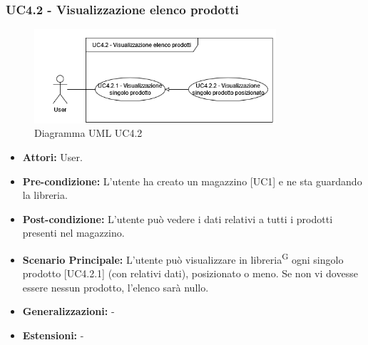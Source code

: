 \subsubsection{UC4.2 - Visualizzazione elenco prodotti}
\begin{figure}[H]
  \centering
  \includegraphics[width=0.8\textwidth]{UC_diagrams_1-10/UC4.2.drawio.png}
   \caption{Diagramma UML UC4.2}
\end{figure}
\begin{itemize}
    \item \textbf{Attori:} User.
    \item \textbf{Pre-condizione:}  L'utente ha creato un magazzino [UC1] e ne sta guardando la libreria.
    \item \textbf{Post-condizione:} L'utente può vedere i dati relativi a tutti i prodotti presenti nel magazzino.
    \item \textbf{Scenario Principale:} L'utente può visualizzare in libreria\textsuperscript{G} ogni singolo prodotto [UC4.2.1] (con relativi dati), posizionato o meno. Se non vi dovesse essere nessun prodotto, l'elenco sarà nullo.
    \item \textbf{Generalizzazioni:} -
    \item \textbf{Estensioni:} -
\end{itemize}


